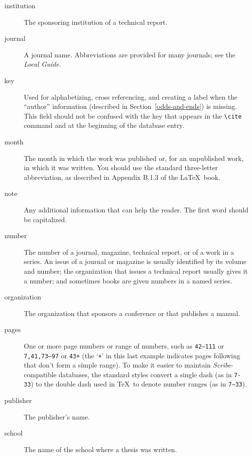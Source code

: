 \begin{description}
\item[institution\hfill]
The sponsoring institution of a technical report.

\item[journal\hfill]
A journal name.
Abbreviations are provided for many journals; see the {\it Local Guide}.

\item[key\hfill]
Used for alphabetizing, cross referencing, and creating a label when
the ``author'' information
(described in Section~\ref{odds-and-ends}) is missing.
This field should not be confused with the key that appears in the
\hbox{\verb|\cite|} command and at the beginning of the database entry.

\item[month\hfill]
The month in which the work was
published or, for an unpublished work, in which it was written.
You should use the standard three-letter abbreviation,
as described in Appendix B.1.3 of the \LaTeX\ book.

\item[note\hfill]
Any additional information that can help the reader.
The first word should be capitalized.

\item[number\hfill]
The number of a journal, magazine, technical report,
or of a work in a series.
An issue of a journal or magazine is usually
identified by its volume and number;
the organization that issues a
technical report usually gives it a number;
and sometimes books are given numbers in a named series.

\item[organization\hfill]
The organization that sponsors a conference or that publishes a \hbox{manual}.

\item[pages\hfill]
One or more page numbers or range of numbers,
such as \hbox{\tt 42--111} or \hbox{\tt 7,41,73--97} or \hbox{\tt 43+}
(the `{\tt +}' in this last example indicates pages following
that don't form a simple range).
To make it easier to maintain {\em Scribe\/}-compatible databases,
the standard styles convert a single dash (as in \hbox{\tt 7-33})
to the double dash used in \TeX\ to denote number ranges
(as in \hbox{\tt 7--33}).

\item[publisher\hfill]
The publisher's name.

\item[school\hfill]
The name of the school where a thesis was written.


\end{description}
